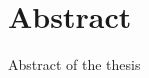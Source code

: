 \begingroup
\let\clearpage\relax
\let\cleardoublepage\relax
\let\cleardoublepage\relax

\chapter*{Abstract}


Abstract of the thesis

\endgroup

\cleardoublepage%






\vfill